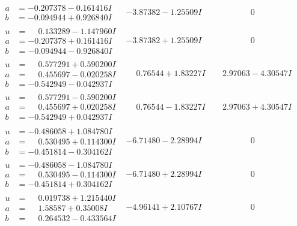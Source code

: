 \documentclass[1p]{elsarticle_modified}
\theoremstyle{definition}
\begin{document}
$$\begin{array}{c|c|c}
\begin{aligned}
a &= -0.207378 - 0.161416 I \\
b &= -0.094944 + 0.926840 I\end{aligned}
 & -3.87382 - 1.25509 I & \phantom{-0.000000 } 0 \\ \hline\begin{aligned}
u &= \phantom{-}0.133289 - 1.147960 I \\
a &= -0.207378 + 0.161416 I \\
b &= -0.094944 - 0.926840 I\end{aligned}
 & -3.87382 + 1.25509 I & \phantom{-0.000000 } 0 \\ \hline\begin{aligned}
u &= \phantom{-}0.577291 + 0.590200 I \\
a &= \phantom{-}0.455697 - 0.020258 I \\
b &= -0.542949 - 0.042937 I\end{aligned}
 & \phantom{-}0.76544 + 1.83227 I & \phantom{-}2.97063 - 4.30547 I \\ \hline\begin{aligned}
u &= \phantom{-}0.577291 - 0.590200 I \\
a &= \phantom{-}0.455697 + 0.020258 I \\
b &= -0.542949 + 0.042937 I\end{aligned}
 & \phantom{-}0.76544 - 1.83227 I & \phantom{-}2.97063 + 4.30547 I \\ \hline\begin{aligned}
u &= -0.486058 + 1.084780 I \\
a &= \phantom{-}0.530495 + 0.114300 I \\
b &= -0.451814 - 0.304162 I\end{aligned}
 & -6.71480 - 2.28994 I & \phantom{-0.000000 } 0 \\ \hline\begin{aligned}
u &= -0.486058 - 1.084780 I \\
a &= \phantom{-}0.530495 - 0.114300 I \\
b &= -0.451814 + 0.304162 I\end{aligned}
 & -6.71480 + 2.28994 I & \phantom{-0.000000 } 0 \\ \hline\begin{aligned}
u &= \phantom{-}0.019738 + 1.215440 I \\
a &= \phantom{-}1.58587 + 0.35008 I \\
b &= \phantom{-}0.264532 - 0.433564 I\end{aligned}
 & -4.96141 + 2.10767 I & \phantom{-0.000000 } 0 \\ \hline\begin{aligned}

\end{aligned}
\end{array}$$
\end{document}
